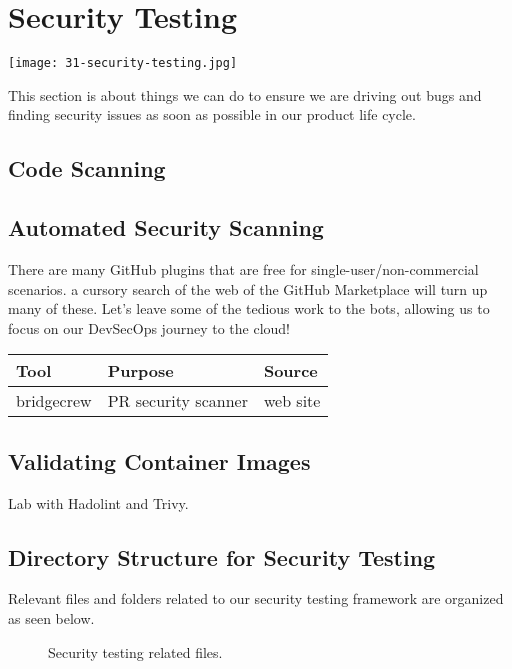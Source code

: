 \chapter{Security Testing}

\texttt{[image: 31-security-testing.jpg]}

This section is about things we can do to ensure we are driving out bugs and finding security issues as soon as possible in our product life cycle.


\section{Code Scanning}




\section{Automated Security Scanning}

\justifying
There are many GitHub plugins that are free for single-user/non-commercial scenarios. a cursory search of the web of the
GitHub Marketplace will turn up many of these. Let's leave some of the
tedious work to the bots, allowing us to focus on our DevSecOps journey to the cloud!

\justifying
\begin{tabular}{| p{2.3cm}| p{4.5cm} | p{8.5cm} |}
    \hline
    \textbf{Tool}& \textbf{Purpose}& \textbf{Source} \\
    \hline
    bridgecrew & PR security scanner & web site \\
    \hline
\end{tabular}

\section{Validating Container Images}

\justifying
Lab with Hadolint and Trivy.



\section{Directory Structure for Security Testing}

\justifying
Relevant files and folders related to our security testing framework are organized as seen below.

\begin{figure}[!htb]
    
    \caption{Security testing related files.}
    \label{sectest}
\end{figure}
